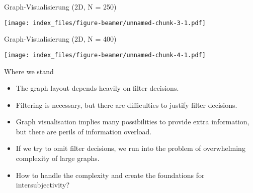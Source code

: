 \documentclass[
  ignorenonframetext,
]{beamer}
\begin{document}
\begin{frame}{Graph-Visualisierung (2D, N = 250)}
\protect\hypertarget{graph-visualisierung-2d-n-250}{}

\texttt{[image: index\_files/figure-beamer/unnamed-chunk-3-1.pdf]}

\end{frame}

\begin{frame}{Graph-Visualisierung (2D, N = 400)}
\protect\hypertarget{graph-visualisierung-2d-n-400}{}

\texttt{[image: index\_files/figure-beamer/unnamed-chunk-4-1.pdf]}

\end{frame}

\begin{frame}{Where we stand}
\protect\hypertarget{where-we-stand}{}

\begin{itemize}
\item
  The graph layout depends heavily on filter decisions.
\item
  Filtering is necessary, but there are difficulties to justify filter
  decisions.
\item
  Graph visualisation implies many possibilities to provide extra
  information, but there are perils of information overload.
\item
  If we try to omit filter decisions, we run into the problem of
  overwhelming complexity of large graphs.
\item
  How to handle the complexity and create the foundations for
  intersubjectivity?
\end{itemize}

\end{frame}
\end{document}
